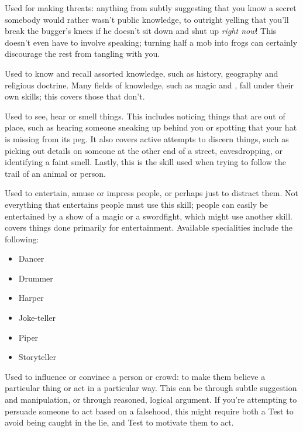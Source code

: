 
Used for making threats: anything from subtly suggesting that you know a secret somebody would rather wasn't public knowledge, to outright yelling that you'll break the bugger's knees if he doesn't sit down and shut up \emph{right now}!
This doesn't even have to involve speaking; turning half a mob into frogs can certainly discourage the rest from tangling with you.


Used to know and recall assorted knowledge, such as history, geography and religious doctrine. %
Many fields of knowledge, such as magic and , fall under their own skills; this covers those that don't.


Used to see, hear or smell things.
This includes noticing things that are out of place, such as hearing someone sneaking up behind you or spotting that your hat is missing from its peg.
It also covers active attempts to discern things, such as picking out details on someone at the other end of a street, eavesdropping, or identifying a faint smell.
Lastly, this is the skill used when trying to follow the trail of an animal or person.


Used to entertain, amuse or impress people, or perhaps just to distract them.
Not everything that entertains people must use this skill; people can easily be entertained by a show of a magic or a swordfight, which might use another skill.
 covers things done primarily for entertainment.
Available specialities include the following:

\begin{itemize}
	\item Dancer
	\item Drummer
	\item Harper
	\item Joke-teller
	\item Piper
	\item Storyteller
\end{itemize}


Used to influence or convince a person or crowd: to make them believe a particular thing or act in a particular way.
This can be through subtle suggestion and manipulation, or through reasoned, logical argument.
If you're attempting to persuade someone to act based on a falsehood, this might require both a  Test to avoid being caught in the lie, and  Test to motivate them to act.

